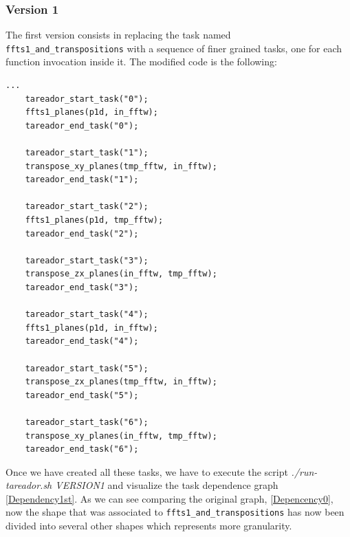 \documentclass[12]{article}
\begin{document}
\subsubsection{Version 1}

The first version consists in replacing the task named \texttt{ffts1\_and\_transpositions} with a sequence of finer grained tasks, one for each function invocation inside it. The modified code is the following: 
\\
\begin{lstlisting}
...
    tareador_start_task("0");
    ffts1_planes(p1d, in_fftw);
    tareador_end_task("0");

    tareador_start_task("1");
    transpose_xy_planes(tmp_fftw, in_fftw);
    tareador_end_task("1");

    tareador_start_task("2");
    ffts1_planes(p1d, tmp_fftw);
    tareador_end_task("2");

    tareador_start_task("3");	
    transpose_zx_planes(in_fftw, tmp_fftw);
    tareador_end_task("3");
    
    tareador_start_task("4");
    ffts1_planes(p1d, in_fftw);
    tareador_end_task("4");

    tareador_start_task("5");
    transpose_zx_planes(tmp_fftw, in_fftw);
    tareador_end_task("5");

    tareador_start_task("6");
    transpose_xy_planes(in_fftw, tmp_fftw);
    tareador_end_task("6");
\end{lstlisting}

Once we have created all these tasks, we have to execute the script \textit{./run-tareador.sh VERSION1} and visualize the task dependence graph \ref{Dependency1st}. As we can see comparing the original graph, \ref{Depencency0}, now the shape that was associated to \texttt{ffts1\_and\_transpositions} has now been divided into several other shapes which represents more granularity. 
\end{document}
